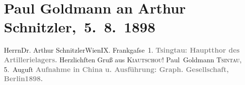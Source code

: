 

         \renewcommand{\erwaehnteInstitutionen}{Institutionen: Graphische Gesellschaft (Berlin)}
         \renewcommand{\erwaehnteOrte}{Orte: Artillerielager Tsingtau, Berlin, China, Frankgasse, Kiautschou, Qingdao, Wien}
         \renewcommand{\erwaehnteWerke}{}
               \section[ Paul Goldmann an Arthur Schnitzler, 5. 8. 1898]{ Paul Goldmann an Arthur Schnitzler, 5. 8. 1898}\nopagebreak{}\rehead{ }\begin{ledgroupsized}[t]{13cm}\normalsize\beginnumbering \toendnotes[C]{\smallbreak\pagebreak[2]} 
\pstart{}{\pb}Herrn\pend{}\pstart{}Dr. Arthur Schnitzler\pend{}\pstart{}Wien\pend{}\pstart{}IX. Frankgaſse 1.\pend{}{\bigskip}\pstart
           \noindent{}\centering{}{\pb}\textcolor{gray}{\textbf{Tsingtau: Hauptthor des
                     Artillerielagers.}}\pend
           \pstart
           Herzlichſten Gruß aus \textsc{Kiautschou}! \spacefill\mbox{Paul Goldmann}\pend
           \pstart
           \textsc{Tsintau}, 5. Auguſt\pend
           \pstart
           \centering{}\textcolor{gray}{\textbf{Aufnahme in China u.
                     Ausführung: Graph. Gesellschaft, Berlin1898.}}\pend
           
         
         \endnumbering{}\end{ledgroupsized}  \newcommand{\dateiname}{L02855}\newcommand{\titel}{Paul Goldmann an Arthur Schnitzler, 5. 8. 1898}\newcommand{\editorInnen}{Martin Anton Müller und Laura Untner}
      